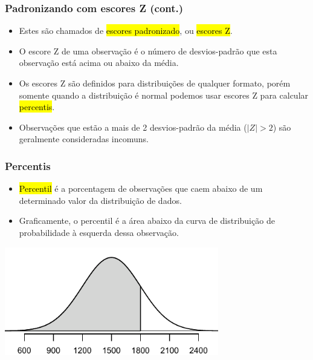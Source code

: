 
\begin{frame}
\frametitle{Padronizando com escores Z (cont.)}

\begin{itemize}
\justifying
\item Estes são chamados de \hl{escores padronizado}, ou \hl{escores Z}.
\justifying
\item O escore Z de uma observação é o número de desvios-padrão que esta observação está acima ou abaixo da média.\\
\formula{\[Z = \frac{observacao - media}{SD}\]}
\justifying
\item Os escores Z são definidos para distribuições de qualquer formato, porém somente quando a distribuição é normal podemos usar escores Z para calcular \hl{percentis}.
\justifying
\item Observações que estão a mais de 2 desvios-padrão da média ($ | Z |> 2 $) são geralmente consideradas incomuns.

\end{itemize}

\end{frame}


\begin{frame}
\frametitle{Percentis}

\begin{itemize}
\justifying
\item \hl{Percentil} é a porcentagem de observações que caem abaixo de um determinado valor da distribuição de dados.
\justifying
\item Graficamente, o percentil é a área abaixo da curva de distribuição de probabilidade à esquerda dessa observação.

\end{itemize}

\begin{center}
\includegraphics[width=0.7\textwidth]{3-1_normal_distribution/satBelow1800.pdf}
\end{center}

\end{frame}

